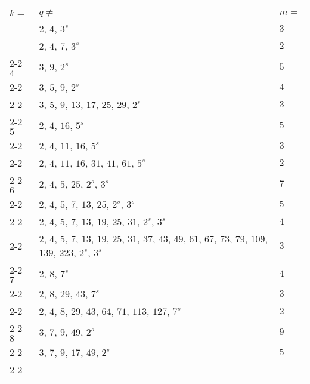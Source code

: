 \documentclass[11pt,reqno]{amsart}
\begin{document}
\begin{longtable}{ | p{1.8cm} | p{12cm} | p{1.8cm} | }
\hline
\boldmath$k=$ &  \boldmath$q \neq$ & \boldmath$m=$\\
\hline \hline
\multirow{2}{*}{} $3$ & $2$, $4$, $3^s$ & $3$ \\ \cline{2-2} \cline{3-3} 
                  	         & $2$, $4$, $7$, $3^s$ &   $2$ \\ \cline{2-2} \cline{3-3} \hline \hline 
\multirow{3}{*}{} $4$ & $3$, $9$, $2^s$ &   $5$ \\ \cline{2-2} \cline{3-3} 
                  	         & $3$, $5$, $9$, $2^s$ &  $4$ \\ \cline{2-2} \cline{3-3} 
                  	         & $3$, $5$, $9$, $13$, $17$, $25$, $29$, $2^s$ &  $3$ \\ \cline{2-2}  \cline{3-3} \hline \hline
\multirow{3}{*}{} $5$ & $2$, $4$, $16$, $5^s$ & $5$ \\ \cline{2-2} \cline{3-3} 
                  	         & $2$, $4$, $11$, $16$, $5^s$ & $3$ \\ \cline{2-2} \cline{3-3} 
                  	         & $2$, $4$, $11$, $16$, $31$, $41$, $61$, $5^s$ & $2$ \\ \cline{2-2}  \cline{3-3} \hline \hline 	      
\multirow{4}{*}{} $6$ & $2$, $4$, $5$, $25$, $2^s$, $3^s$ & $7$ \\ \cline{2-2} \cline{3-3} 
					    & $2$, $4$, $5$, $7$, $13$, $25$, $2^s$, $3^s$ & $5$ \\ \cline{2-2} \cline{3-3} 
                  	         & $2$, $4$, $5$, $7$, $13$, $19$, $25$, $31$, $2^s$, $3^s$ & $4$ \\ \cline{2-2} \cline{3-3} 
                  	         & $2$, $4$, $5$, $7$, $13$, $19$, $25$, $31$, $37$, $43$, $49$, $61$, $67$, $73$, $79$, $109$, $139$, $223$, $2^s$, $3^s$ & $3$ \\  \cline{2-2}  \cline{3-3} \hline \hline
\multirow{3}{*}{} $7$ & $2$, $8$, $7^s$ & $4$  \\ \cline{2-2} \cline{3-3} 
                  	         & $2$, $8$, $29$, $43$, $7^s$ & $3$ \\ \cline{2-2} \cline{3-3} 
                  	         & $2$, $4$, $8$, $29$, $43$, $64$, $71$, $113$, $127$, $7^s$ & $2$ \\ \cline{2-2}  \cline{3-3} \hline \hline
\multirow{4}{*}{} $8$ & $3$, $7$, $9$, $49$, $2^s$ & $9$ \\ \cline{2-2} \cline{3-3} 
                  	       & $3$, $7$, $9$, $17$, $49$, $2^s$ & $5$ \\ \cline{2-2} \cline{3-3} 

\end{longtable}
\end{document}
